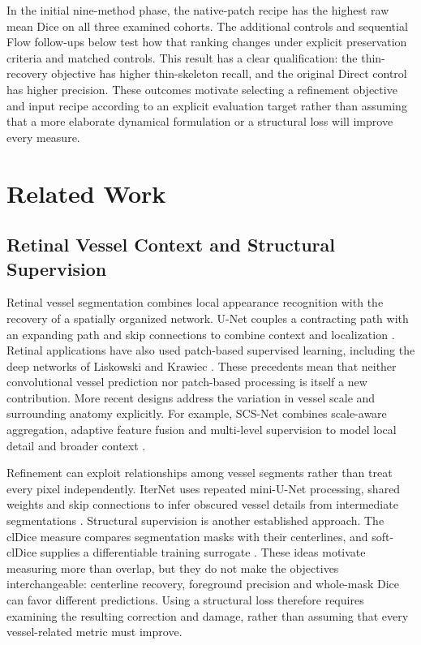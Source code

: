 \documentclass[jimaging,article,submit,pdftex,moreauthors]{Definitions/mdpi}
\begin{document}
In the initial nine-method phase, the native-patch recipe has the highest raw mean Dice on all three examined cohorts. The additional controls and sequential Flow follow-ups below test how that ranking changes under explicit preservation criteria and matched controls. This result has a clear qualification: the thin-recovery objective has higher thin-skeleton recall, and the original Direct control has higher precision. These outcomes motivate selecting a refinement objective and input recipe according to an explicit evaluation target rather than assuming that a more elaborate dynamical formulation or a structural loss will improve every measure.

\section{Related Work}
\label{sec:related_work}

\subsection{Retinal Vessel Context and Structural Supervision}
Retinal vessel segmentation combines local appearance recognition with the recovery
of a spatially organized network. U-Net couples a contracting path with an expanding
path and skip connections to combine context and localization
\cite{Ronneberger2015}. Retinal applications have also used patch-based supervised
learning, including the deep networks of Liskowski and Krawiec
\cite{Liskowski2016}. These precedents mean that neither convolutional vessel
prediction nor patch-based processing is itself a new contribution. More recent
designs address the variation in vessel scale and surrounding anatomy explicitly.
For example, SCS-Net combines scale-aware aggregation, adaptive feature fusion and
multi-level supervision to model local detail and broader context
\cite{Wu2021SCSNet}.

Refinement can exploit relationships among vessel segments rather than treat every
pixel independently. IterNet uses repeated mini-U-Net processing, shared weights
and skip connections to infer obscured vessel details from intermediate
segmentations \cite{Li2020IterNet}. Structural supervision is another established
approach. The clDice measure compares segmentation masks with their centerlines,
and soft-clDice supplies a differentiable training surrogate
\cite{Shit2021}. These ideas motivate measuring more than overlap, but they do not
make the objectives interchangeable: centerline recovery, foreground precision and
whole-mask Dice can favor different predictions. Using a structural loss therefore
requires examining the resulting correction and damage, rather than assuming that
every vessel-related metric must improve.
\end{document}
